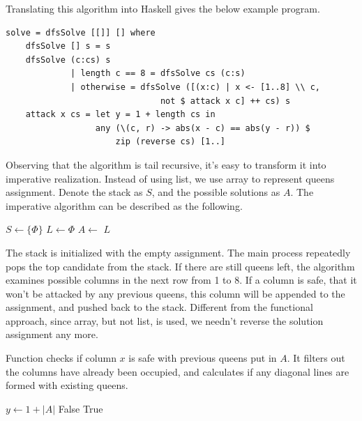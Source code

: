 \documentclass[UTF8]{article}
\begin{document}
Translating this algorithm into Haskell gives the below example program.

\lstset{language=Haskell}
\begin{lstlisting}
solve = dfsSolve [[]] [] where
    dfsSolve [] s = s
    dfsSolve (c:cs) s
             | length c == 8 = dfsSolve cs (c:s)
             | otherwise = dfsSolve ([(x:c) | x <- [1..8] \\ c,
                               not $ attack x c] ++ cs) s
    attack x cs = let y = 1 + length cs in
                  any (\(c, r) -> abs(x - c) == abs(y - r)) $
                      zip (reverse cs) [1..]
\end{lstlisting}

Observing that the algorithm is tail recursive, it's easy to transform it into
imperative realization. Instead of using list, we use array to represent queens assignment.
Denote the stack as $S$, and the possible solutions as $A$. The imperative
algorithm can be described as the following.

\begin{algorithmic}[1]
  \State $S \gets \{\Phi\}$
  \State $L \gets \Phi$ 
    \State $A \gets$  
      \State {}
    \Else
          \State {}
        \EndIf
      \EndFor
    \EndIf
  \EndWhile
  \State \Return $L$
\EndFunction
\end{algorithmic}

The stack is initialized with the empty assignment. The main process repeatedly
pops the top candidate from the stack. If there are still queens left, the algorithm
examines possible columns in the next row from 1 to 8. If a column is safe, that
it won't be attacked by any previous queens, this column will be appended
to the assignment, and pushed back to the stack. Different from the functional
approach, since array, but not list, is used, we needn't reverse the
solution assignment any more.

Function  checks if column $x$ is safe with previous queens put
in $A$. It filters out the columns have already been occupied, and calculates
if any diagonal lines are formed with existing queens.

\begin{algorithmic}[1]
  \State $y \gets 1 + |A|$
      \State \Return False
    \EndIf
  \EndFor
  \State \Return True
\EndFunction
\end{algorithmic}
\end{document}
